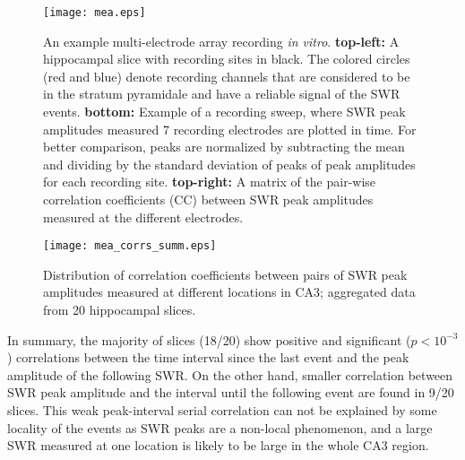     \begin{figure}
      \center
      \texttt{[image: mea.eps]}
      \caption{
        An example multi-electrode array recording {\it in vitro}.
        \textbf{top-left:} A hippocampal slice with recording sites in black.
        The colored circles (red and blue) denote recording channels that are
        considered to be in the stratum pyramidale and have a reliable signal
        of the SWR events. \textbf{bottom:} Example of a recording
        sweep, where SWR peak amplitudes measured 7 recording electrodes are
        plotted in time. For better comparison, peaks are normalized by
        subtracting the mean and dividing by the standard deviation of peaks of
        peak amplitudes for each recording site.  \textbf{top-right:} A matrix
        of the pair-wise correlation coefficients (CC) between SWR peak
        amplitudes measured at the different electrodes.
      }
    \label{fig:peak_correlation_ex}
    \end{figure}

    \begin{figure}
    \centering
      \texttt{[image: mea\_corrs\_summ.eps]}
      \caption{
        Distribution of correlation coefficients between pairs of SWR peak
        amplitudes measured at different locations in CA3; aggregated data from
        20 hippocampal slices.
             }
    \label{fig:peak_correlation_summ}
    \end{figure}
    
    In summary, the majority of slices (18/20) show positive and significant
    ($p<10^{-3}$) correlations between the time interval since the last event
    and the peak amplitude of the following SWR. On the other hand, smaller
    correlation between SWR peak amplitude and the interval until the
    following event are found in 9/20 slices. This weak peak-interval serial
    correlation can not be explained by some locality of the events as SWR
    peaks are a non-local phenomenon, and a large SWR measured at one location
    is likely to be large in the whole CA3 region.

